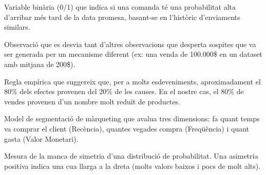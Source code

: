 \documentclass[12pt,a4paper]{article}
\begin{document}
\begin{description}[leftmargin=3cm, style=nextline]
    \item[Late Delivery Risk]
    Variable binària (0/1) que indica si una comanda té una probabilitat alta d'arribar més tard de la data promesa, basant-se en l'històric d'enviaments similars.
    
    \item[Outlier (Valor Atípic)]
    Observació que es desvia tant d'altres observacions que desperta sospites que va ser generada per un mecanisme diferent (ex: una venda de 100.000\$ en un dataset amb mitjana de 200\$).
    
    \item[Pareto Principle (80/20)]
    Regla empírica que suggereix que, per a molts esdeveniments, aproximadament el 80\% dels efectes provenen del 20\% de les causes. En el nostre cas, el 80\% de vendes provenen d'un nombre molt reduït de productes.
    
    \item[RFM (Recency, Frequency, Monetary)]
    Model de segmentació de màrqueting que avalua tres dimensions: fa quant temps va comprar el client (Recència), quantes vegades compra (Freqüència) i quant gasta (Valor Monetari).
    
    \item[Skewness (Asimetria)]
    Mesura de la manca de simetria d'una distribució de probabilitat. Una asimetria positiva indica una cua llarga a la dreta (molts valors baixos i pocs de molt alts).

\end{description}


\end{document}
